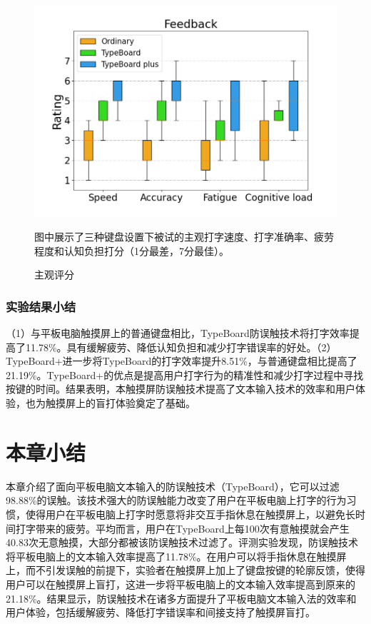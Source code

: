 \begin{figure}[!tbh]
	\includegraphics[width=0.7\linewidth]{figures/TypeBoard_subjective_feedback.png}
	\centering
	\caption*{图中展示了三种键盘设置下被试的主观打字速度、打字准确率、疲劳程度和认知负担打分（1分最差，7分最佳）。}
	\caption{主观评分}
	\label{fig:TypeBoard_subjective_feedback}
\end{figure}

\subsubsection{实验结果小结}

（1）与平板电脑触摸屏上的普通键盘相比，TypeBoard防误触技术将打字效率提高了11.78\%。具有缓解疲劳、降低认知负担和减少打字错误率的好处。（2）TypeBoard+进一步将TypeBoard的打字效率提升8.51\%，与普通键盘相比提高了21.19\%。TypeBoard+的优点是提高用户打字行为的精准性和减少打字过程中寻找按键的时间。结果表明，本触摸屏防误触技术提高了文本输入技术的效率和用户体验，也为触摸屏上的盲打体验奠定了基础。

\section{本章小结}

本章介绍了面向平板电脑文本输入的防误触技术（TypeBoard），它可以过滤98.88\%的误触。该技术强大的防误触能力改变了用户在平板电脑上打字的行为习惯，使得用户在平板电脑上打字时愿意将非交互手指休息在触摸屏上，以避免长时间打字带来的疲劳。平均而言，用户在TypeBoard上每100次有意触摸就会产生40.83次无意触摸，大部分都被该防误触技术过滤了。评测实验发现，防误触技术将平板电脑上的文本输入效率提高了11.78\%。在用户可以将手指休息在触摸屏上，而不引发误触的前提下，实验者在触摸屏上加上了键盘按键的轮廓反馈，使得用户可以在触摸屏上盲打，这进一步将平板电脑上的文本输入效率提高到原来的21.18\%。结果显示，防误触技术在诸多方面提升了平板电脑文本输入法的效率和用户体验，包括缓解疲劳、降低打字错误率和间接支持了触摸屏盲打。
